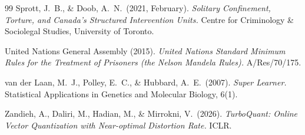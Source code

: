 \documentclass[11pt,a4paper]{article}
\theoremstyle{plain}
\theoremstyle{definition}
\theoremstyle{remark}
\begin{document}
\begin{thebibliography}{99}
Sprott, J.\ B., \& Doob, A.\ N.\ (2021, February).
\emph{Solitary Confinement, Torture, and Canada's Structured
Intervention Units.} Centre for Criminology \& Sociolegal Studies,
University of Toronto.

United Nations General Assembly (2015).
\emph{United Nations Standard Minimum Rules for the Treatment of
Prisoners (the Nelson Mandela Rules).} A/Res/70/175.

van der Laan, M.\ J., Polley, E.\ C., \& Hubbard, A.\ E.\ (2007).
\emph{Super Learner.}
Statistical Applications in Genetics and Molecular Biology, 6(1).

Zandieh, A., Daliri, M., Hadian, M., \& Mirrokni, V.\ (2026).
\emph{TurboQuant: Online Vector Quantization with Near-optimal
Distortion Rate.} ICLR.

\end{thebibliography}
\end{document}
